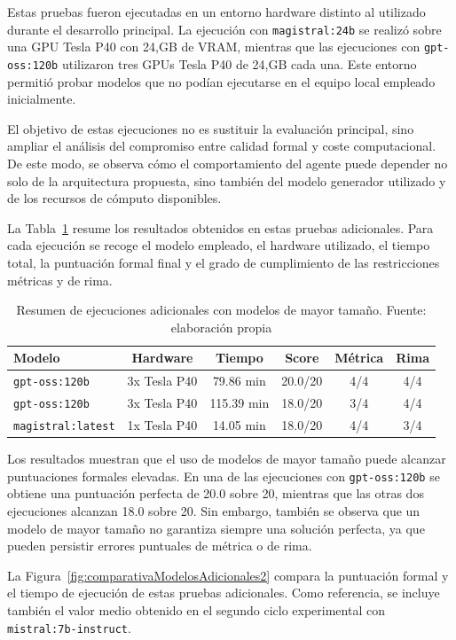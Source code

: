 \documentclass[12pt,a4paper,twoside,openright]{book}
\begin{document}
Estas pruebas fueron ejecutadas en un entorno hardware distinto al utilizado durante el desarrollo principal.
La ejecución con \texttt{magistral:24b} se realizó sobre una GPU Tesla P40 con 24,GB de VRAM, mientras que las ejecuciones con \texttt{gpt-oss:120b} utilizaron tres GPUs Tesla P40 de 24,GB cada una.
Este entorno permitió probar modelos que no podían ejecutarse en el equipo local empleado inicialmente.

El objetivo de estas ejecuciones no es sustituir la evaluación principal, sino ampliar el análisis del compromiso entre calidad formal y coste computacional.
De este modo, se observa cómo el comportamiento del agente puede depender no solo de la arquitectura propuesta, sino también del modelo generador utilizado y de los recursos de cómputo disponibles.

La Tabla~\ref{tab:ejecucionesModelosAdicionales2} resume los resultados obtenidos en estas pruebas adicionales.
Para cada ejecución se recoge el modelo empleado, el hardware utilizado, el tiempo total, la puntuación formal final y el grado de cumplimiento de las restricciones métricas y de rima.

\begin{table}[h]
\centering
\small
\begin{tabular}{lccccc}
\toprule
Modelo & Hardware & Tiempo & Score & Métrica & Rima \\
\midrule
\texttt{gpt-oss:120b} & 3x Tesla P40 & 79.86 min & 20.0/20 & 4/4 & 4/4 \\
\texttt{gpt-oss:120b} & 3x Tesla P40 & 115.39 min & 18.0/20 & 3/4 & 4/4 \\
\texttt{magistral:latest} & 1x Tesla P40 & 14.05 min & 18.0/20 & 4/4 & 3/4 \\
\bottomrule
\end{tabular}
\caption{Resumen de ejecuciones adicionales con modelos de mayor tamaño. Fuente: elaboración propia}
\label{tab:ejecucionesModelosAdicionales2}
\end{table}

Los resultados muestran que el uso de modelos de mayor tamaño puede alcanzar puntuaciones formales elevadas.
En una de las ejecuciones con \texttt{gpt-oss:120b} se obtiene una puntuación perfecta de 20.0 sobre 20, mientras que las otras dos ejecuciones alcanzan 18.0 sobre 20.
Sin embargo, también se observa que un modelo de mayor tamaño no garantiza siempre una solución perfecta, ya que pueden persistir errores puntuales de métrica o de rima.

La Figura~\ref{fig:comparativaModelosAdicionales2} compara la puntuación formal y el tiempo de ejecución de estas pruebas adicionales. Como referencia, se incluye también el valor medio obtenido en el segundo ciclo experimental con \texttt{mistral:7b-instruct}.
\end{document}
